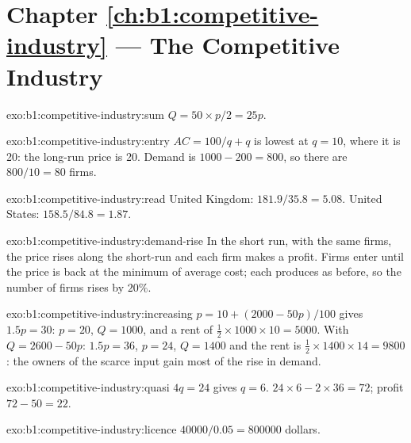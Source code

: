 \section*{Chapter \ref{ch:b1:competitive-industry} --- The Competitive Industry}

\begin{solution}{exo:b1:competitive-industry:sum}
$Q = 50 \times p/2 = 25p$.
\end{solution}

\begin{solution}{exo:b1:competitive-industry:entry}
$AC = 100/q + q$ is lowest at $q = 10$, where it is 20: the long-run price is
20. Demand is $1000 - 200 = 800$, so there are $800/10 = 80$ firms.
\end{solution}

\begin{solution}{exo:b1:competitive-industry:read}
United Kingdom: $181.9/35.8 = 5.08$. United States: $158.5/84.8 = 1.87$.
\end{solution}

\begin{solution}{exo:b1:competitive-industry:demand-rise}
In the short run, with the same firms, the price rises along the
short-run  and each firm makes a profit. Firms enter until
the price is back at the minimum of average cost; each produces as before,
so the number of firms rises by $20\%$.
\end{solution}

\begin{solution}{exo:b1:competitive-industry:increasing}
$p = 10 + (2000 - 50p)/100$ gives $1.5p = 30$: $p = 20$, $Q = 1000$, and a rent of
$\tfrac12 \times 1000 \times 10 = 5000$. With $Q = 2600 - 50p$: $1.5p = 36$, $p = 24$, $Q = 1400$ and the
rent is $\tfrac12 \times 1400 \times 14 = 9800$: the owners of the scarce input gain most of the
rise in demand.
\end{solution}

\begin{solution}{exo:b1:competitive-industry:quasi}
$4q = 24$ gives $q = 6$.  $24 \times 6 - 2 \times 36 = 72$; profit $72 - 50 = 22$.
\end{solution}

\begin{solution}{exo:b1:competitive-industry:licence}
$40000/0.05 = 800000$ dollars.
\end{solution}

